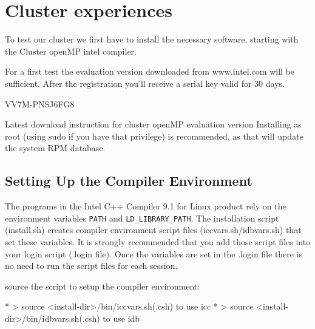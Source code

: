  
\appendix
{}
\chapter{Cluster experiences}

To test our cluster we first have to install the necessary software, starting with the Cluster openMP intel compiler.

For a first test the evaluation version downloaded from www.intel.com will be sufficient. After the registration you'll receive a serial key valid for 30 days.

VV7M-PNSJ6FG8 

Latest download instruction for cluster openMP evaluation version
Installing as root (using sudo if you have that privilege) is recommended, as that will update the system RPM database. 

\section{Setting Up the Compiler Environment}
\label{sec:SettingUpTheCompilerEnvironment}

The programs in the Intel C++ Compiler 9.1 for Linux product rely on the environment variables \verb*|PATH| and \verb*|LD_LIBRARY_PATH|.
The installation script (install.sh) creates compiler environment script files (iccvars.sh/idbvars.sh) that set these variables. It is strongly recommended that you add those script files into your login script (.login file). 
Once the variables are set in the .login file there is no need to run the script files for each session.

source the script to setup the compiler environment:

    * > source <install-dir>/bin/iccvars.sh(.csh)
      to use icc
    * > source <install-dir>/bin/idbvars.sh(.csh)
      to use idb

